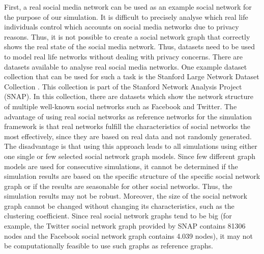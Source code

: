 First, a real social media network can be used as an example social network
for the purpose of our simulation. 
It is difficult to precisely analyse which real life individuals
control which accounts on social media networks due to privacy reasons.
Thus, it is not possible to create a social network graph that 
correctly shows the real state of the social media network.
Thus, datasets need to be used to model real life networks without 
dealing with privacy concerns. There are datasets available to analyse
real social media networks. One example dataset collection that can 
be used for such a task is the Stanford 
Large Network Dataset Collection \cite{snapnets}.
This collection is part of the Stanford Network Analysis Project (SNAP).
In this collection, there are datasets which show the network structure
of multiple well-known social networks such as Facebook and Twitter.
The advantage of using real social networks as reference networks
for the simulation framework is that real networks fulfill the 
characteristics of social networks the most effectively, since they
are based on real data and not randomly generated. The disadvantage
is that using this approach leads to all simulations using either
one single or few selected social network graph models. Since 
few different graph models are used for consecutive simulations,
it cannot be determined if the simulation results are based on the 
specific structure of the specific social network graph or if the results 
are seasonable for other social networks. Thus, the simulation results
may not be robust. Moreover, the size of the social network graph 
cannot be changed without changing its characteristics, such as 
the clustering coefficient. Since real social network graphs tend to be 
big (for example, the Twitter social network graph provided by SNAP
contains 81306 nodes and the Facebook social network graph contains 
4.039 nodes), it may not be computationally feasible to use such graphs
as reference graphs.


